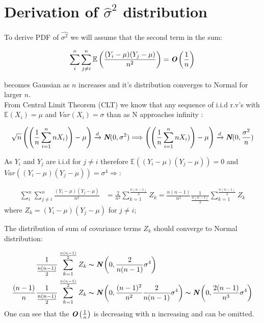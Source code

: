 \section{Derivation of $\hat{\sigma}^2$ distribution}
\label{sigma_hat_distiribution}

To derive PDF of $\hat{\sigma^2}$ we will assume that the second term in the sum:

\begin{equation}
\sum_{i}^{n}\sum_{j \ne i}^{n}\mathbb{E}\left(\frac{(Y_i -\mu)(Y_j -\mu)}{n^2}\right) = \textbf{\em O}\left(\frac{1}{n}\right)
\end{equation}

becomes Gaussian as $n$ increases and it's distribution converges to Normal for larger $n$. \\
From Central Limit Theorem (CLT) we know that any sequence of i.i.d r.v's with $\mathbb{E}(X_i) = \mu$ and $Var(X_i) = \sigma$ than as N approaches infinity :

\begin{equation}
\sqrt{n}\left(\left(\frac{1}{n}\sum_{i=1}^n{n}X_i)\right) - \mu \right) \xrightarrow{d} \textbf{\em N}(0,\sigma^2) \Longrightarrow
\left(\left(\frac{1}{n}\sum_{i=1}^n{n}X_i)\right) - \mu \right)  \xrightarrow{d} \textbf{\em N}(0,\frac{\sigma^2}{n})  
\label{CLT}																								
\end{equation}

As $Y_i$ and $Y_j$ are i.i.d for $j \ne i$ therefore $\mathbb{E}((Y_i -\mu)(Y_j -\mu)) = 0$ and $Var((Y_i -\mu)(Y_j -\mu)) = \sigma^4 \Rightarrow $:

\begin{equation}
\begin{aligned}
\sum_{i}^{n}\sum_{j \ne i}^{n}\frac{(Y_i -\mu)(Y_j -\mu)}{n^2} & = \frac{2}{n^2}\sum_{k=1}^{\frac{n(n-1)}{2}}Z_k 
																															   = \frac{n(n-1)}{n^2}\frac{1}{\frac{n(n-1)}{2}}\sum_{k=1}^{\frac{n(n-1)}{2}}Z_k
\end{aligned}																										
\end{equation}
where $Z_k = (Y_i -\mu)(Y_j -\mu)$ for $j \ne i$;

The distribution of sum of covariance terms $Z_k$ should converge to Normal distribution: 

\begin{equation}
\begin{aligned}
\frac{1}{\frac{n(n-1)}{2}}\sum_{k=1}^{\frac{n(n-1)}{2}}Z_k & \thicksim \textbf{\em N}\left(0,\frac{2}{n(n-1)}\sigma^4\right) \\
\frac{(n-1)}{n}\frac{1}{\frac{n(n-1)}{2}}\sum_{k=1}^{\frac{n(n-1)}{2}}Z_k & \thicksim \textbf{\em N}\left(0,\frac{(n-1)^2}{n^2}\frac{2}{n(n-1)}\sigma^4\right) 
																																					 \thicksim \textbf{\em N}\left(0,\frac{2(n-1)}{n^3}\sigma^4\right) 
\end{aligned}																										
\end{equation}
One can see that the $\textbf{\em O}\left(\frac{1}{n}\right)$ is decreasing with n increasing and can be omitted.

